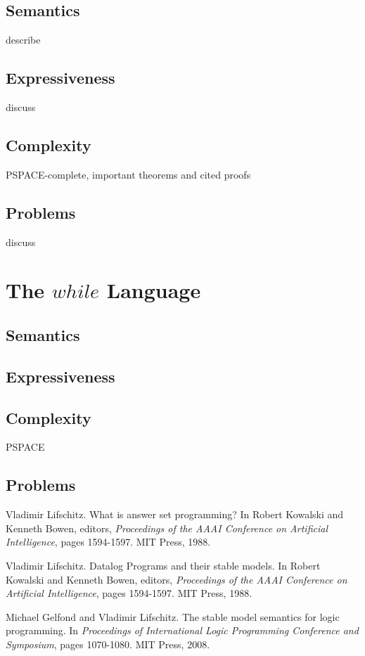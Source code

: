 \documentclass[11pt]{article}
\begin{document}
\subsection{Semantics}
describe
\subsection{Expressiveness}
discuss
\subsection{Complexity}
PSPACE-complete,
important theorems and cited proofs
\subsection{Problems}
discuss

\section{The $while$ Language}
\subsection{Semantics}
\subsection{Expressiveness}
\subsection{Complexity}
PSPACE
\subsection{Problems}



\begin{thebibliography}{9}
  Vladimir Lifschitz. 
  What is answer set programming? 
  In Robert Kowalski and Kenneth Bowen, editors, 
  \textit{Proceedings of the AAAI Conference on Artificial Intelligence}, pages 1594-1597. 
  MIT Press, 1988.

  Vladimir Lifschitz. 
  Datalog Programs and their stable models.
  In Robert Kowalski and Kenneth Bowen, editors, 
  \textit{Proceedings of the AAAI Conference on Artificial Intelligence}, pages 1594-1597. 
  MIT Press, 1988.

  Michael Gelfond and Vladimir Lifschitz. 
  The stable model semantics for logic programming.  
  In \textit{Proceedings of International Logic Programming Conference and Symposium}, pages 1070-1080. 
  MIT Press, 2008.
\end{thebibliography}
\end{document}
